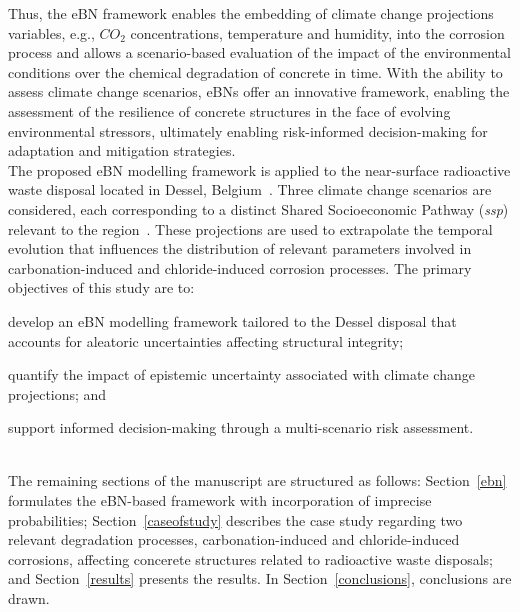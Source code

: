 Thus, the eBN framework enables the embedding of climate change projections variables, e.g., $CO_2$ concentrations, temperature and humidity, into the corrosion process and allows a scenario-based evaluation of the impact of the environmental conditions over the chemical degradation of concrete in time.
With the ability to assess climate change scenarios, eBNs offer an innovative framework, enabling the assessment of the resilience of concrete structures in the face of evolving environmental stressors, ultimately enabling risk-informed decision-making for adaptation and mitigation strategies.\\

The proposed eBN modelling framework is applied to the near-surface radioactive waste disposal located in Dessel, Belgium~\cite{tosoni_comprehensiveness_2019-1}.
Three climate change scenarios are considered, each corresponding to a distinct Shared Socioeconomic Pathway (\textit{ssp}) relevant to the region~\cite{CMIP6}.
These projections are used to extrapolate the temporal evolution that influences the distribution of relevant parameters involved in carbonation-induced and chloride-induced corrosion processes.
The primary objectives of this study are to: 
\begin{enumerate*}[label=\roman*)]
    \item develop an eBN modelling framework tailored to the Dessel disposal that accounts for aleatoric uncertainties affecting structural integrity;
    \item quantify the impact of epistemic uncertainty associated with climate change projections; and
    \item support informed decision-making through a multi-scenario risk assessment.
\end{enumerate*}
\\

The remaining sections of the manuscript are structured as follows: Section~\ref{ebn} formulates the eBN-based framework with incorporation of imprecise probabilities; Section~\ref{caseofstudy} describes the case study regarding two relevant degradation processes, carbonation-induced and chloride-induced corrosions, affecting concerete structures related to radioactive waste disposals; and Section~\ref{results} presents the results. In Section~\ref{conclusions}, conclusions are drawn.

